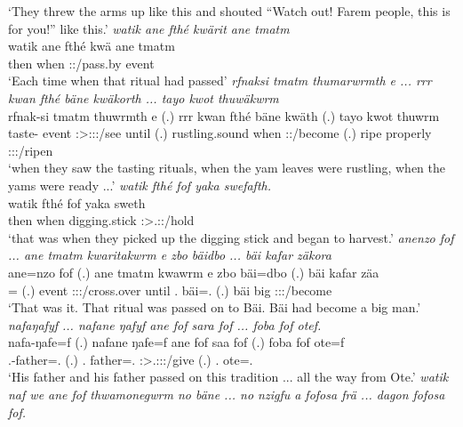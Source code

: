 \begin{exe}
	\trans `They threw the arms up like this and shouted ``Watch out! Farem people, this is for you!'' like this.'
	\emph{watik ane fthé kwärit ane tmatm}\\
	\gll watik ane fthé kwä ane tmatm\\ 
	then \Dem{} when \Stsg:\Sbj:\Iter/pass.by \Dem{} event\\
	\trans `Each time when that ritual had passed'
	\emph{rfnaksi tmatm thumarwrmth e ... rrr kwan fthé bäne kwäkorth ... tayo kwot thuwäkwrm}\\
	\gll rfnak-si tmatm thuwrmth e (.) {rrr kwan} fthé bäne kwäth (.) tayo kwot thuwrm\\ 
	taste-\Nmlz{} event \Stpl:\Sbj>\Stpl:\Obj:\Pst:\Dur/see until (.) rustling.sound when \Recog{} \Stpl:\Sbj:\Iter/become (.) ripe properly \Stpl:\Sbj:\Pst:\Dur/ripen\\
	\trans `when they saw the tasting rituals, when the yam leaves were rustling, when the yams were ready ...'
	\emph{watik fthé fof yaka swefafth.}\\
	\gll watik fthé fof yaka sweth\\ 
	then when \Emph{} digging.stick \Stpl:\Sbj>\Tsg.\Masc:\Obj:\Iter/hold\\
	\trans `that was when they picked up the digging stick and began to harvest.'
	\emph{anenzo fof ... ane tmatm kwaritakwrm e zbo bäidbo ... bäi kafar zäkora}\\
	\gll ane=nzo fof (.) ane tmatm kwawrm e zbo bäi=dbo (.) bäi kafar zäa\\ 
	\Dem=\Only{} \Emph{} (.) \Dem{} event \Sg:\Sbj:\Pst:\Dur/cross.over until \Prox.\All{} bäi=\All.\Sg{} (.) bäi big \Sg:\Sbj:\Pst:\Pfv/become\\
	\trans `That was it. That ritual was passed on to Bäi. Bäi had become a big man.'
	\emph{nafaŋafyf ... nafane ŋafyf ane fof sara fof ... foba fof otef.}\\
	\gll nafa-ŋafe=f (.) nafane ŋafe=f ane fof saa fof (.) foba fof ote=f\\ 
	\Third.\Poss-father=\Erg.\Sg{} (.) \Tsg.\Poss{} father=\Erg.\Sg{} \Dem{} \Emph{} \Sg:\Sbj>\Tsg.\Masc:\Io:\Pst:\Pfv/give \Emph{} (.) \Dist.\Abl{} \Emph{} ote=\Erg.\Sg\\
	\trans `His father and his father passed on this tradition ... all the way from Ote.'
	\emph{watik naf we ane fof thwamonegwrm no bäne ... no nzigfu a fofosa frä ... dagon fofosa fof.}\\

\end{exe}
